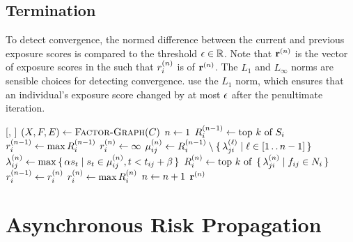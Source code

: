 \subsection{Termination}

To detect convergence, the normed difference between the current and previous exposure scores is compared to the threshold $\epsilon \in \mathbb{R}$. Note that $\mathbf{r}^{(n)}$ is the vector of exposure scores in the  such that $r_{i}^{(n)}$ is  of $\mathbf{r}^{(n)}$. The $L_1$ and $L_\infty$ norms are sensible choices for detecting convergence. \citet{Ayday2021} use the $L_1$ norm, which ensures that an individual's exposure score changed by at most $\epsilon$ after the penultimate iteration.

\begin{function}[H]{\nRiskPropagation}[\vScores, \vContacts]
  \State $(\vVariables, \vFactors, \vEdges) \assign \cCreateFactorGraph[\vContacts]$
  \State $n \leftarrow 1$
  \ForEach{$\vVariable[i] \in \vVariables$}
    \State $R_{i}^{(n - 1)} \leftarrow \text{top } k \text{ of } S_i$
    \State $r_{i}^{(n - 1)} \leftarrow \max R_{i}^{(n - 1)}$
    \State $r_{i}^{(n)} \leftarrow \infty$
  \EndFor
    \ForEach{$\{\vVariable[i], \vFactor[ij]\} \in \vEdges$}
      \State $\mu_{ij}^{(n)} \leftarrow R_{i}^{(n - 1)} \setminus \set{ \lambda_{ji}^{(\ell)} | \ell \in [1 \mathinner{\ldotp \ldotp} n - 1]}$
    \EndFor
    \ForEach{$\{\vVariable[i], \vFactor[ij]\} \in \vEdges$}
      \State $\lambda_{ij}^{(n)} \leftarrow \max \set{ \alpha s_t| s_t\in \mu_{ij}^{(n)}, t< t_{ij} + \beta}$
    \EndFor
    \ForEach{$\vVariable[i] \in \vVariables$}
      \State $\vRiskScores{i}{n} \assign \topK{\setBuilder{\vFactorMessage{j}{i}{n}}{\vFactor[ij] \in \vNeighbors_i}}$
    \EndFor
    \ForEach{$\vVariable[i] \in \vVariables$}
      \State $r_{i}^{(n - 1)} \leftarrow r_{i}^{(n)}$
      \State $r_{i}^{(n)} \leftarrow \max R_{i}^{(n)}$
    \EndFor
    \State $n \leftarrow n + 1$
  \EndWhile
  \State \Return $\mathbf{r}^{(n)}$
\end{function}

\section{Asynchronous Risk Propagation}\label{sec:asynchronous}

